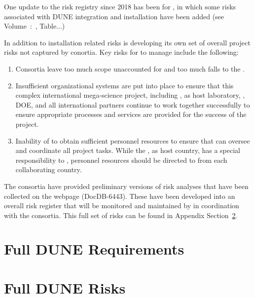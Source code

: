 One update to the risk registry since 2018 has been for , in which some
risks  associated with  DUNE  integration and  installation have  been
added (see Volume~\volnumbersp:~\voltitlesp, Table...)

In addition to installation related risks  is developing its
own set of overall project risks not captured by conortia.  Key risks
for  to manage include the following:
\begin{enumerate}
\item Consortia leave too much scope unaccounted for and too much falls
  to  the .
\item Insufficient organizational systems are put into place to
  ensure that this complex international mega-science project,
  including , \fnal as host laboratory, \surf, DOE, and all international
  partners continue to work together successfully to ensure
  appropriate processes and services are provided for the success of
  the project.
\item Inability of  to obtain sufficient personnel resources to
  ensure that  can oversee and coordinate all project tasks.  While the , 
  as host country, has a special responsibility to , personnel resources should
  be directed to  from each collaborating country. 
\end{enumerate}

The consortia have provided preliminary versions of risk analyses that
have been collected on the  webpage (DocDB-6443). These have
been developed into an overall risk register that will be monitored
and maintained by  in coordination with the consortia. This
full set of risks can be found in Appendix
Section~\ref{sec:fdsp-app-risk}.

\section{Full DUNE Requirements}
\label{sec:fdsp-app-requirements}

%



\section{Full DUNE Risks}
\label{sec:fdsp-app-risk}



